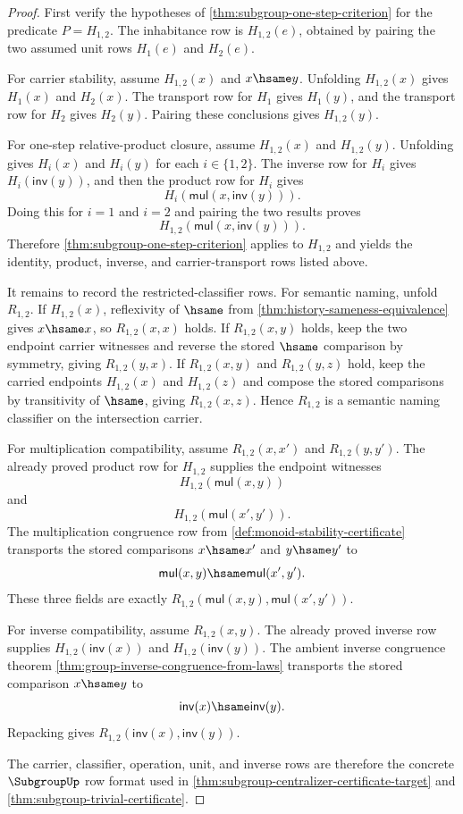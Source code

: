 \begin{proof}
First verify the hypotheses of \autoref{thm:subgroup-one-step-criterion} for the predicate $P=H_{1,2}$. The inhabitance row is $H_{1,2}(e)$, obtained by pairing the two assumed unit rows $H_1(e)$ and $H_2(e)$.

For carrier stability, assume $H_{1,2}(x)$ and $x\hsame y$. Unfolding $H_{1,2}(x)$ gives $H_1(x)$ and $H_2(x)$. The transport row for $H_1$ gives $H_1(y)$, and the transport row for $H_2$ gives $H_2(y)$. Pairing these conclusions gives $H_{1,2}(y)$.

For one-step relative-product closure, assume $H_{1,2}(x)$ and $H_{1,2}(y)$. Unfolding gives $H_i(x)$ and $H_i(y)$ for each $i\in\{1,2\}$. The inverse row for $H_i$ gives $H_i(\mathsf{inv}(y))$, and then the product row for $H_i$ gives
$$
H_i(\mathsf{mul}(x,\mathsf{inv}(y))).
$$
Doing this for $i=1$ and $i=2$ and pairing the two results proves
$$
H_{1,2}(\mathsf{mul}(x,\mathsf{inv}(y))).
$$
Therefore \autoref{thm:subgroup-one-step-criterion} applies to $H_{1,2}$ and yields the identity, product, inverse, and carrier-transport rows listed above.

It remains to record the restricted-classifier rows. For semantic naming, unfold $R_{1,2}$. If $H_{1,2}(x)$, reflexivity of $\hsame$ from \autoref{thm:history-sameness-equivalence} gives $x\hsame x$, so $R_{1,2}(x,x)$ holds. If $R_{1,2}(x,y)$ holds, keep the two endpoint carrier witnesses and reverse the stored $\hsame$ comparison by symmetry, giving $R_{1,2}(y,x)$. If $R_{1,2}(x,y)$ and $R_{1,2}(y,z)$ hold, keep the carried endpoints $H_{1,2}(x)$ and $H_{1,2}(z)$ and compose the stored comparisons by transitivity of $\hsame$, giving $R_{1,2}(x,z)$. Hence $R_{1,2}$ is a semantic naming classifier on the intersection carrier.

For multiplication compatibility, assume $R_{1,2}(x,x')$ and $R_{1,2}(y,y')$. The already proved product row for $H_{1,2}$ supplies the endpoint witnesses
$$
H_{1,2}(\mathsf{mul}(x,y))
$$
and
$$
H_{1,2}(\mathsf{mul}(x',y')).
$$
The multiplication congruence row from \autoref{def:monoid-stability-certificate} transports the stored comparisons $x\hsame x'$ and $y\hsame y'$ to
$$
\mathsf{mul}(x,y)\hsame\mathsf{mul}(x',y').
$$
These three fields are exactly $R_{1,2}(\mathsf{mul}(x,y),\mathsf{mul}(x',y'))$.

For inverse compatibility, assume $R_{1,2}(x,y)$. The already proved inverse row supplies $H_{1,2}(\mathsf{inv}(x))$ and $H_{1,2}(\mathsf{inv}(y))$. The ambient inverse congruence theorem \autoref{thm:group-inverse-congruence-from-laws} transports the stored comparison $x\hsame y$ to
$$
\mathsf{inv}(x)\hsame\mathsf{inv}(y).
$$
Repacking gives $R_{1,2}(\mathsf{inv}(x),\mathsf{inv}(y))$.

The carrier, classifier, operation, unit, and inverse rows are therefore the concrete $\SubgroupUp$ row format used in \autoref{thm:subgroup-centralizer-certificate-target} and \autoref{thm:subgroup-trivial-certificate}.
\end{proof}
